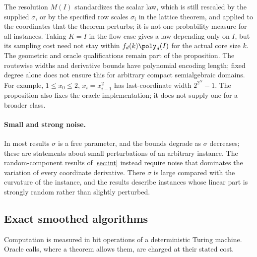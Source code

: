 The resolution $M(I)$ standardizes the scalar law, which is still rescaled
by the supplied $\sigma$, or by the specified row scales $\sigma_i$ in the
lattice theorem, and applied to the coordinates that the theorem
perturbs; it is not one probability measure for all instances. Taking
$K=I$ in the flow case gives a law depending only on $I$, but its sampling
cost need not stay within $f_d(k)\poly_d(I)$ for the actual core size $k$.
The geometric and oracle qualifications remain part of the proposition.
The routewise widths and derivative bounds have polynomial encoding length;
fixed degree alone does not ensure this for arbitrary compact semialgebraic
domains. For example, $1\le x_0\le2$, $x_i=x_{i-1}^2$ has last-coordinate
width $2^{2^N}-1$. The proposition also fixes the oracle implementation; it
does not supply one for a broader class.

\paragraph{Small and strong noise.}
In most results $\sigma$ is a free parameter, and the bounds degrade as
$\sigma$ decreases; these are statements about small perturbations of an
arbitrary instance. The random-component results of \cref{sec:int} instead
require noise that dominates the variation of every coordinate derivative.
There $\sigma$ is large compared with the curvature of the instance, and the
results describe instances whose linear part is strongly random rather than
slightly perturbed.

\subsection{Exact smoothed algorithms}\label{sec:model:algorithms}

Computation is measured in bit operations of a deterministic Turing
machine. Oracle calls, where a theorem allows them, are charged at their
stated cost.

